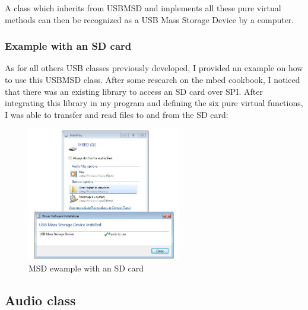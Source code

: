 \documentclass[pdftex,10pt,a4paper]{report}
\begin{document}
A class which inherits from USBMSD and implements all these pure virtual methods can then be recognized as a USB Mass Storage Device by a computer.

\subsubsection{Example with an SD card}
As for all others USB classes previously developed, I provided an example on how to use this USBMSD class. After some research on the mbed cookbook, I noticed that there was an existing library to access an SD card over SPI. After integrating this library in my program and defining the six pure virtual functions, I was able to transfer and read files to and from the SD card:

\begin{figure}[h!]
		\centering
		\includegraphics[width=0.6\textwidth]{./msd_windows.jpg}
		\caption{MSD ewample with an SD card}
		\label{MSD ewample with an SD card}
\end{figure}
 


\subsection{Audio class}
\end{document}

